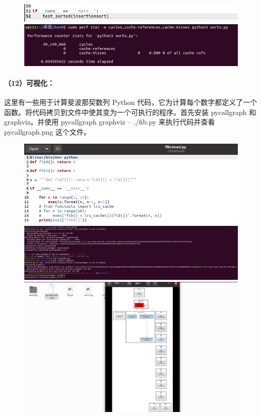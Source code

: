 \documentclass[a4paper, 12pt]{article}
\begin{document}
	\begin{figure}[H]
		\centering
		\includegraphics[width=1\textwidth]{026.jpg}
		\includegraphics[width=1\textwidth]{027.jpg}
	\end{figure}
	
	\paragraph{（12）可视化：}
	这里有一些用于计算斐波那契数列 Python 代码，它为计算每个数字都定义了一个函数。将代码拷贝到文件中使其变为一个可执行的程序。首先安装 pycallgraph 和 graphviz。并使用 pycallgraph graphviz -- ./fib.py 来执行代码并查看 pycallgraph.png 这个文件。
	
	\begin{figure}[H]
		\centering
		\includegraphics[width=1\textwidth]{028.jpg}
		\includegraphics[width=1\textwidth]{030.jpg}
		\includegraphics[width=1\textwidth]{031.jpg}
	\end{figure}
	
\end{document}
